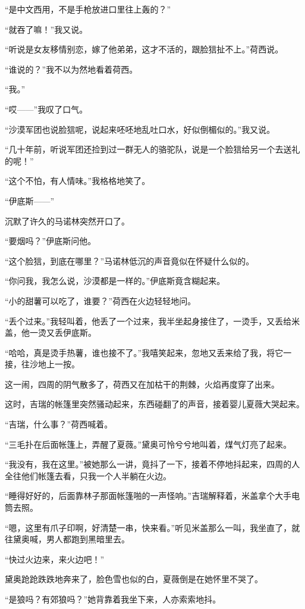 \par “是中文西用，不是手枪放进口里往上轰的？”
\par “就吞了嘛！”我又说。
\par “听说是女友移情别恋，嫁了他弟弟，这才不活的，跟脸狺扯不上。”荷西说。
\par “谁说的？”我不以为然地看着荷西。
\par “我。”
\par “哎——”我叹了口气。
\par “沙漠军团也说脸狺呢，说起来呸呸地乱吐口水，好似倒楣似的。”我又说。
\par “几十年前，听说军团还捡到过一群无人的骆驼队，说是一个脸狺给另一个去送礼的呢！”
\par “这个不怕，有人情味。”我格格地笑了。
\par “伊底斯——”
\par 沉默了许久的马诺林突然开口了。
\par “要烟吗？”伊底斯问他。
\par “这个脸狺，到底在哪里？”马诺林低沉的声音竟似在怀疑什么似的。
\par “你问我，我怎么说，沙漠都是一样的。”伊底斯竟含糊起来。
\par “小的甜薯可以吃了，谁要？”荷西在火边轻轻地问。
\par “丢个过来。”我轻叫着，他丢了一个过来，我半坐起身接住了，一烫手，又丢给米盖，他一烫又丢伊底斯。
\par “哈哈，真是烫手热薯，谁也接不了。”我嘻笑起来，忽地又丢来给了我，将它一接，往沙地上一按。
\par 这一闹，四周的阴气散多了，荷西又在加枯干的荆棘，火焰再度穿了出来。
\par 这时，吉瑞的帐篷里突然骚动起来，东西碰翻了的声音，接着婴儿夏薇大哭起来。
\par “吉瑞，什么事？”荷西喊着。
\par “三毛扑在后面帐篷上，弄醒了夏薇。”黛奥可怜兮兮地叫着，煤气灯亮了起来。
\par “我没有，我在这里。”被她那么一讲，竟抖了一下，接着不停地抖起来，四周的人全往他们帐篷去看，只我一个人半躺在火边。
\par “睡得好好的，后面靠林子那面帐篷啪的一声怪响。”吉瑞解释着，米盖拿个大手电筒去照。
\par “嗯，这里有爪子印啊，好清楚一串，快来看。”听见米盖那么一叫，我坐直了，就往黛奥喊，男人都跑到黑暗里去。
\par “快过火边来，来火边吧！”
\par 黛奥跄跄跌跌地奔来了，脸色雪也似的白，夏薇倒是在她怀里不哭了。
\par “是狼吗？有郊狼吗？”她背靠着我坐下来，人亦索索地抖。
